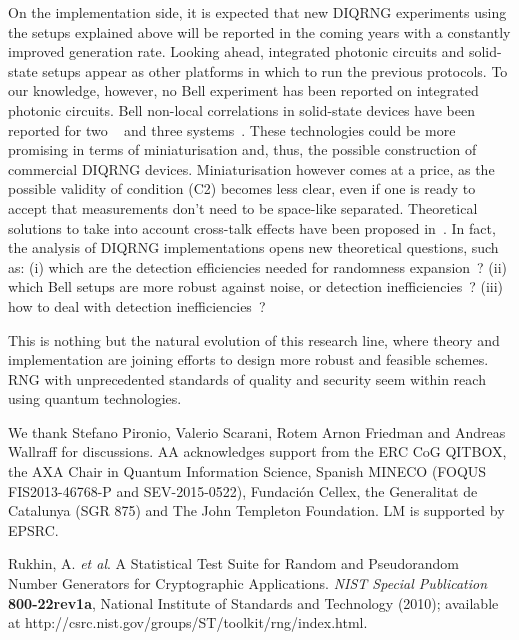 \documentclass[11pt,a4paper]{article}
\begin{document}
{On the implementation side, it is expected that new DIQRNG experiments using the setups explained above will be reported in the coming years with a constantly improved generation rate. Looking ahead, integrated photonic circuits and solid-state setups appear as other platforms in which to run the previous protocols. To our knowledge, however, no Bell experiment has been reported on integrated photonic circuits. Bell non-local correlations in solid-state devices have been reported for two ~\cite{martinis,morello} and three systems~\cite{martinis2,dicarlo}. These technologies could be more promising in terms of miniaturisation and, thus, the possible construction of commercial DIQRNG devices. Miniaturisation however comes at a price, as the possible validity of condition (C2) becomes less clear, even if one is ready to accept that measurements don't need to be space-like separated. Theoretical solutions to take into account cross-talk effects have been proposed in~\cite{silman}. In fact, the analysis of DIQRNG implementations opens new theoretical questions, such as: (i) which are the detection efficiencies needed for randomness expansion~\cite{passaro}? (ii) which Bell setups are more robust against noise, or detection inefficiencies~\cite{mattar}? (iii) how to deal with detection inefficiencies~\cite{singapore}?
%

This is nothing but the natural evolution of this research line, where theory and implementation are joining efforts to design more robust and feasible schemes. RNG with unprecedented standards of quality and security seem within reach using quantum technologies.

We thank Stefano Pironio, Valerio Scarani, Rotem Arnon Friedman and Andreas Wallraff for discussions.
AA acknowledges support from the ERC CoG QITBOX, the AXA Chair in Quantum Information Science, Spanish MINECO (FOQUS FIS2013-46768-P and SEV-2015-0522), Fundaci\'on Cellex, the Generalitat de Catalunya (SGR 875) and The John Templeton Foundation.
LM is supported by EPSRC.


\begin{thebibliography}{99}

Rukhin, A.  {\em et al}. A Statistical Test Suite for Random and Pseudorandom Number Generators for Cryptographic Applications. \textit{NIST Special Publication} \textbf{800-22rev1a}, National Institute of Standards and Technology (2010); available at http://csrc.nist.gov/groups/ST/toolkit/rng/index.html.


\end{thebibliography}}
\end{document}
